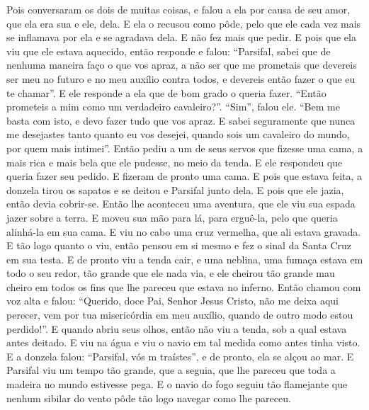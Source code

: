 Pois conversaram os dois de muitas coisas, e falou a ela por causa de seu
amor, que ela era sua e ele, dela. E ela o recusou como pôde, pelo que ele cada
vez mais se inflamava por ela e se agradava dela. E não fez mais que pedir. E
pois que ela viu que ele estava aquecido, então responde e falou: “Parsifal,
sabei que de nenhuma maneira faço o que vos apraz, a não ser que me prometais
que devereis ser meu no futuro e no meu auxílio contra todos, e devereis então
fazer o que eu te chamar”. E ele responde a ela que de bom grado o queria
fazer. “Então prometeis a mim como um verdadeiro cavaleiro?”. “Sim”, falou ele.
“Bem me basta com isto, e devo fazer tudo que vos apraz. E sabei seguramente
que nunca me desejastes tanto quanto eu vos desejei, quando sois um cavaleiro
do mundo, por quem mais intimei”. Então pediu a um de seus servos que fizesse
uma cama, a mais rica e mais bela que ele pudesse, no meio da tenda. E ele
respondeu que queria fazer seu pedido. E fizeram de pronto uma cama. E pois que
estava feita, a donzela tirou os sapatos e se deitou e Parsifal junto dela. E
pois que ele jazia, então devia cobrir-se. Então lhe aconteceu uma aventura,
que ele viu sua espada jazer sobre a terra. E moveu sua mão para lá, para
erguê-la, pelo que queria alinhá-la em sua cama. E viu no cabo uma cruz
vermelha, que ali estava gravada. E tão logo quanto o viu, então pensou em si
mesmo e fez o sinal da Santa Cruz em sua testa. E de pronto viu a tenda cair, e
uma neblina, uma fumaça estava em todo o seu redor, tão grande que ele nada
via, e ele cheirou tão grande mau cheiro em todos os fins que lhe pareceu que
estava no inferno. Então chamou com voz alta e falou: “Querido, doce Pai,
Senhor Jesus Cristo, não me deixa aqui perecer, vem por tua misericórdia em meu
auxílio, quando de outro modo estou perdido!”. E quando abriu seus olhos, então
não viu a tenda, sob a qual estava antes deitado. E viu na água e viu o navio
em tal medida como antes tinha visto. E a donzela falou: “Parsifal, vós m
traístes”, e de pronto, ela se alçou ao mar. E Parsifal viu um tempo tão
grande, que a seguia, que lhe pareceu que toda a madeira no mundo estivesse
pega. E o navio do fogo seguiu tão flamejante que nenhum sibilar do vento pôde
tão logo navegar como lhe pareceu. 

